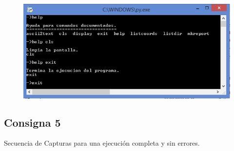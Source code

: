 \documentclass[a4paper,12pt]{article}
\begin{document}
\begin{figure}[h!]
    \begin{adjustbox}{max width=\textwidth, center}
        \includegraphics{C4/S7_C4.PNG}
    \end{adjustbox}
\end{figure}


\subsection{Consigna 5}
Secuencia de Capturas para una ejecución completa y sin errores.

\end{document}
